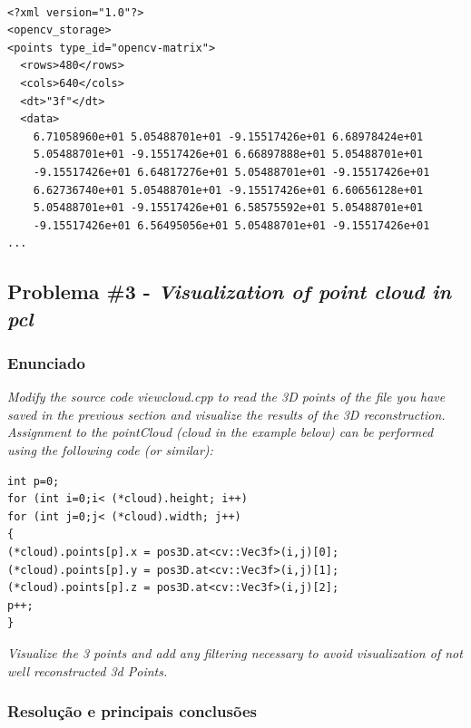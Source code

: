 \documentclass[portuguese, times, mirror]{revdetua}
\begin{document}
\begin{lstlisting}[caption=points3d.xml ,label=code:xml]

<?xml version="1.0"?>
<opencv_storage>
<points type_id="opencv-matrix">
  <rows>480</rows>
  <cols>640</cols>
  <dt>"3f"</dt>
  <data>
    6.71058960e+01 5.05488701e+01 -9.15517426e+01 6.68978424e+01
    5.05488701e+01 -9.15517426e+01 6.66897888e+01 5.05488701e+01
    -9.15517426e+01 6.64817276e+01 5.05488701e+01 -9.15517426e+01
    6.62736740e+01 5.05488701e+01 -9.15517426e+01 6.60656128e+01
    5.05488701e+01 -9.15517426e+01 6.58575592e+01 5.05488701e+01
    -9.15517426e+01 6.56495056e+01 5.05488701e+01 -9.15517426e+01
...
\end{lstlisting}






\subsection{Problema \#3 - \textit{Visualization of point cloud in pcl}}

\subsubsection{Enunciado}
\textit{Modify the source code viewcloud.cpp to read the 3D points of the file you have saved in the
previous section and visualize the results of the 3D reconstruction. 
Assignment to the pointCloud (cloud in the example below) can be performed using the following
code (or similar): }

\begin{lstlisting}[caption=Excerto de código (enunciado),label=code:C]
int p=0;
for (int i=0;i< (*cloud).height; i++)
for (int j=0;j< (*cloud).width; j++)
{
(*cloud).points[p].x = pos3D.at<cv::Vec3f>(i,j)[0];
(*cloud).points[p].y = pos3D.at<cv::Vec3f>(i,j)[1];
(*cloud).points[p].z = pos3D.at<cv::Vec3f>(i,j)[2];
p++;
} 
\end{lstlisting}

\textit{Visualize the 3 points and add any filtering necessary to avoid visualization of not well reconstructed 3d Points.}


\subsubsection{Resolução e principais conclusões}
\end{document}
